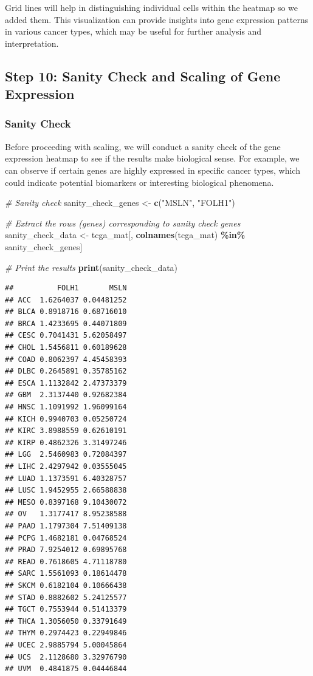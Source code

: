 \documentclass[
]{book}
\newenvironment{Shaded}{\begin{snugshade}}{\end{snugshade}}
\newcommand{\CommentTok}[1]{\textcolor[rgb]{0.56,0.35,0.01}{\textit{#1}}}
\newcommand{\FunctionTok}[1]{\textcolor[rgb]{0.13,0.29,0.53}{\textbf{#1}}}
\newcommand{\NormalTok}[1]{#1}
\newcommand{\OtherTok}[1]{\textcolor[rgb]{0.56,0.35,0.01}{#1}}
\newcommand{\SpecialCharTok}[1]{\textcolor[rgb]{0.81,0.36,0.00}{\textbf{#1}}}
\newcommand{\StringTok}[1]{\textcolor[rgb]{0.31,0.60,0.02}{#1}}
\begin{document}
Grid lines will help in distinguishing individual cells within the heatmap so we added them.
This visualization can provide insights into gene expression patterns in various cancer types, which may be useful for further analysis and interpretation.

\hypertarget{step-10-sanity-check-and-scaling-of-gene-expression}{%
\subsection{Step 10: Sanity Check and Scaling of Gene Expression}\label{step-10-sanity-check-and-scaling-of-gene-expression}}

\hypertarget{sanity-check}{%
\subsubsection{Sanity Check}\label{sanity-check}}

Before proceeding with scaling, we will conduct a sanity check of the gene expression heatmap to see if the results make biological sense. For example, we can observe if certain genes are highly expressed in specific cancer types, which could indicate potential biomarkers or interesting biological phenomena.

\begin{Shaded}
\begin{Highlighting}[]
\CommentTok{\# Sanity check}
\NormalTok{sanity\_check\_genes }\OtherTok{\textless{}{-}} \FunctionTok{c}\NormalTok{(}\StringTok{"MSLN"}\NormalTok{, }\StringTok{"FOLH1"}\NormalTok{)}

\CommentTok{\# Extract the rows (genes) corresponding to sanity check genes}
\NormalTok{sanity\_check\_data }\OtherTok{\textless{}{-}}\NormalTok{ tcga\_mat[, }\FunctionTok{colnames}\NormalTok{(tcga\_mat) }\SpecialCharTok{\%in\%}\NormalTok{ sanity\_check\_genes]}

\CommentTok{\# Print the results}
\FunctionTok{print}\NormalTok{(sanity\_check\_data)}
\end{Highlighting}
\end{Shaded}

\begin{verbatim}
##          FOLH1       MSLN
## ACC  1.6264037 0.04481252
## BLCA 0.8918716 0.68716010
## BRCA 1.4233695 0.44071809
## CESC 0.7041431 5.62058497
## CHOL 1.5456811 0.60189628
## COAD 0.8062397 4.45458393
## DLBC 0.2645891 0.35785162
## ESCA 1.1132842 2.47373379
## GBM  2.3137440 0.92682384
## HNSC 1.1091992 1.96099164
## KICH 0.9940703 0.05250724
## KIRC 3.8988559 0.62610191
## KIRP 0.4862326 3.31497246
## LGG  2.5460983 0.72084397
## LIHC 2.4297942 0.03555045
## LUAD 1.1373591 6.40328757
## LUSC 1.9452955 2.66588838
## MESO 0.8397168 9.10430072
## OV   1.3177417 8.95238588
## PAAD 1.1797304 7.51409138
## PCPG 1.4682181 0.04768524
## PRAD 7.9254012 0.69895768
## READ 0.7618605 4.71118780
## SARC 1.5561093 0.18614478
## SKCM 0.6182104 0.10666438
## STAD 0.8882602 5.24125577
## TGCT 0.7553944 0.51413379
## THCA 1.3056050 0.33791649
## THYM 0.2974423 0.22949846
## UCEC 2.9885794 5.00045864
## UCS  2.1128680 3.32976790
## UVM  0.4841875 0.04446844
\end{verbatim}
\end{document}
